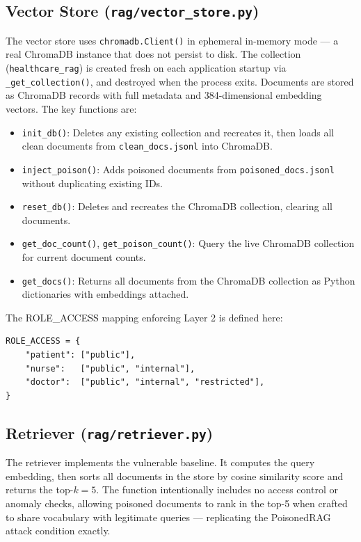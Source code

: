 \subsection{Vector Store (\texttt{rag/vector\_store.py})}

The vector store uses \texttt{chromadb.Client()} in ephemeral in-memory mode --- a real ChromaDB instance that does not persist to disk. The collection (\texttt{healthcare\_rag}) is created fresh on each application startup via \texttt{\_get\_collection()}, and destroyed when the process exits. Documents are stored as ChromaDB records with full metadata and 384-dimensional embedding vectors. The key functions are:

\begin{itemize}
    \item \texttt{init\_db()}: Deletes any existing collection and recreates it, then loads all clean documents from \texttt{clean\_docs.jsonl} into ChromaDB.
    \item \texttt{inject\_poison()}: Adds poisoned documents from \texttt{poisoned\_docs.jsonl} without duplicating existing IDs.
    \item \texttt{reset\_db()}: Deletes and recreates the ChromaDB collection, clearing all documents.
    \item \texttt{get\_doc\_count()}, \texttt{get\_poison\_count()}: Query the live ChromaDB collection for current document counts.
    \item \texttt{get\_docs()}: Returns all documents from the ChromaDB collection as Python dictionaries with embeddings attached.
\end{itemize}

The ROLE\_ACCESS mapping enforcing Layer 2 is defined here:
\begin{verbatim}
ROLE_ACCESS = {
    "patient": ["public"],
    "nurse":   ["public", "internal"],
    "doctor":  ["public", "internal", "restricted"],
}
\end{verbatim}

\subsection{Retriever (\texttt{rag/retriever.py})}

The retriever implements the vulnerable baseline. It computes the query embedding, then sorts all documents in the store by cosine similarity score and returns the top-$k=5$. The function intentionally includes no access control or anomaly checks, allowing poisoned documents to rank in the top-5 when crafted to share vocabulary with legitimate queries --- replicating the PoisonedRAG attack condition exactly.

